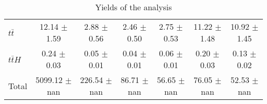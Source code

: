 \begin{table}[H]
\begin{center}
\begin{tabular}{|l|S|S|S|S|S|S|}
   $t\bar{t}$   & 12.14 $\pm$ 1.59 & 2.88 $\pm$ 0.56 & 2.46 $\pm$ 0.50 & 2.75 $\pm$ 0.53 & 11.22 $\pm$ 1.48 & 10.92 $\pm$ 1.45 \\ 
  $t\bar{t}H$   & 0.24 $\pm$ 0.03 & 0.05 $\pm$ 0.01 & 0.04 $\pm$ 0.01 & 0.06 $\pm$ 0.01 & 0.20 $\pm$ 0.03 & 0.13 $\pm$ 0.02 \\ 
\hline 
  Total  & 5099.12 $\pm$ nan & 226.54 $\pm$ nan & 86.71 $\pm$ nan & 56.65 $\pm$ nan & 76.05 $\pm$ nan & 52.53 $\pm$ nan \\ 
\hline 
\end{tabular} 
\caption{Yields of the analysis} 
\end{center} 
\end{table} 

